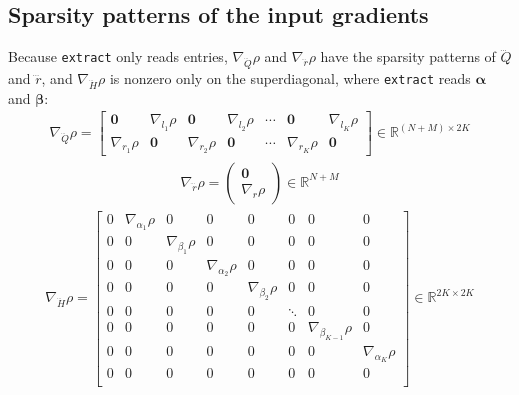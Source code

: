 \documentclass[a4paper,12pt]{article}
\theoremstyle{definition}
\begin{document}
\subsection{Sparsity patterns of the input gradients}\label{app:input_gradients}
Because \texttt{extract} only reads entries, $\nabla_{\dddot{Q}} \rho$ and $\nabla_{\dddot{r}} \rho$ have the sparsity patterns of $\dddot{Q}$ and $\dddot{r}$, and $\nabla_{\dddot{H}} \rho$ is nonzero only on the superdiagonal, where \texttt{extract} reads $\boldsymbol{\alpha}$ and $\boldsymbol{\beta}$:
\begin{align}
    \nabla_{\dddot{Q}} \rho = \begin{bmatrix}\mathbf{0} & \nabla_{l_1}\rho & \mathbf{0} & \nabla_{l_2}\rho & \cdots & \mathbf{0} & \nabla_{l_K}\rho \\ \nabla_{r_1}\rho & \mathbf{0} & \nabla_{r_2}\rho & \mathbf{0} &  \cdots & \nabla_{r_K}\rho & \mathbf{0} \end{bmatrix} \in \mathbb{R}^{(N+M) \times 2K} \label{eq:nabla_Q_sparsity_pattern}
\end{align}
\begin{align}
    \nabla_{\dddot{r}} \rho = \begin{pmatrix}\mathbf{0} \\ \nabla_{r} \rho \end{pmatrix} \in \mathbb{R}^{N+M} \label{eq:nabla_r_sparsity_pattern}
\end{align}
\begin{align}
    \nabla_{\dddot{H}} \rho = \begin{bmatrix} 
    0 & \nabla_{\alpha_1}\rho & 0  & 0 & 0 & 0 & 0 & 0\\
    0 & 0  & \nabla_{\beta_1}\rho & 0 & 0 & 0 & 0 & 0\\
    0 & 0  & 0 & \nabla_{\alpha_2}\rho & 0 & 0 & 0 & 0\\
    0 & 0 & 0 & 0 & \nabla_{\beta_2}\rho & 0 & 0 & 0\\
    0 & 0 & 0 & 0 & 0 & \ddots & 0 & 0\\
    0 & 0 & 0 & 0 & 0 & 0 & \nabla_{\beta_{K-1}}\rho & 0\\
    0 & 0 & 0 & 0 & 0 & 0  & 0 & \nabla_{\alpha_K}\rho\\
    0 & 0 & 0 & 0 & 0 & 0  & 0 & 0\\
    \end{bmatrix} \in \mathbb{R}^{2K \times 2K} \label{eq:nabla_H_sparsity_pattern}
\end{align}
\end{document}
